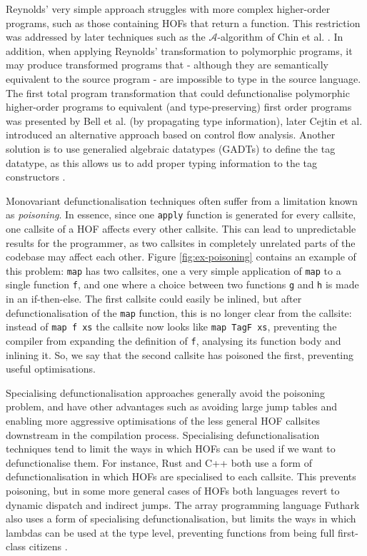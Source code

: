 \documentclass[a4paper,UKenglish,cleveref, autoref, thm-restate]{template/lipics-v2021}
\newcommand{\hof}{HOF\xspace}
\newcommand{\hofs}{HOFs\xspace}
\begin{document}
Reynolds' very simple approach struggles with more complex higher-order programs, such as those containing \hofs that return a function. This restriction was addressed by later techniques such as the $\mathcal{A}$-algorithm of Chin et al. \cite{chin1996removal}. In addition, when applying Reynolds' transformation to polymorphic programs, it may produce transformed programs that -  although they are semantically equivalent to the source program - are impossible to type in the source language. The first total program transformation that could defunctionalise polymorphic higher-order programs to equivalent (and type-preserving) first order programs was presented by Bell et al. \cite{bell1997type} (by propagating type information), later Cejtin et al. \cite{cejtin2000flow} introduced an alternative approach based on control flow analysis. Another solution is to use generalied algebraic datatypes (GADTs) to define the tag datatype, as this allows us to add proper typing information to the tag constructors \cite{pottier2006polymorphic}.

Monovariant defunctionalisation techniques often suffer from a limitation known as \textit{poisoning}. In essence, since one \texttt{apply} function is generated for every callsite, one callsite of a \hof affects every other callsite. This can lead to unpredictable results for the programmer, as two callsites in completely unrelated parts of the codebase may affect each other. Figure \ref{fig:ex-poisoning} contains an example of this problem:
\texttt{map} has two callsites, one a very simple application of \texttt{map} to a single function \texttt{f}, and one where a choice between two functions \texttt{g} and \texttt{h} is made in an if-then-else. The first callsite could easily be inlined, but after defunctionalisation of the \texttt{map} function, this is no longer clear from the callsite: instead of \texttt{map f xs} the callsite now looks like \texttt{map TagF xs}, preventing the compiler from expanding the definition of \texttt{f}, analysing its function body and inlining it. So, we say that the second callsite has poisoned the first, preventing useful optimisations.

Specialising defunctionalisation approaches generally avoid the poisoning problem, and have other advantages such as avoiding large jump tables and enabling more aggressive optimisations of the less general \hof callsites downstream in the compilation process. Specialising defunctionalisation techniques tend to limit the ways in which \hofs can be used if we want to defunctionalise them. For instance, Rust \cite{klabnik2023rust} and C++ \cite{stroustrup2013cpp} both use a form of defunctionalisation in which \hofs are specialised to each callsite. This prevents poisoning, but in some more general cases of \hofs both languages revert to dynamic dispatch and indirect jumps. The array programming language Futhark also uses a form of specialising defunctionalisation, but limits the ways in which lambdas can be used at the type level, preventing functions from being full first-class citizens \cite{hovgaard2018higher}.
\end{document}
